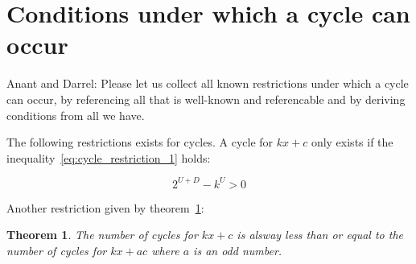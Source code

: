\documentclass[12pt]{amsart}
\newtheorem{theorem}{Theorem}[section]
\theoremstyle{definition}
\begin{document}
\section{Conditions under which a cycle can occur}

Anant and Darrel: Please let us collect all known restrictions under which a cycle can occur, by referencing all that is well-known and referencable and by deriving conditions from all we have.

The following restrictions exists for cycles. A cycle for $kx+c$ only exists if the inequality~\ref{eq:cycle_restriction_1} holds:

\begin{equation}
\label{eq:cycle_restriction_1}
2^{U+D}-k^U>0
\end{equation}

Another restriction given by theorem~\ref{theo:cycle_restriction_2}:

\begin{theorem}
\label{theo:cycle_restriction_2}
The number of cycles for $kx+c$ is alsway less than or equal to the number of cycles for $kx+ac$ where $a$ is an odd number.
\end{theorem}

\vspace{1em}


\end{document}
